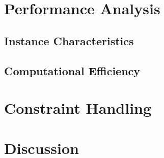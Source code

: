 
\section{Performance Analysis}

\subsection{Instance Characteristics}


\subsection{Computational Efficiency}


\section{Constraint Handling}


\section{Discussion}

